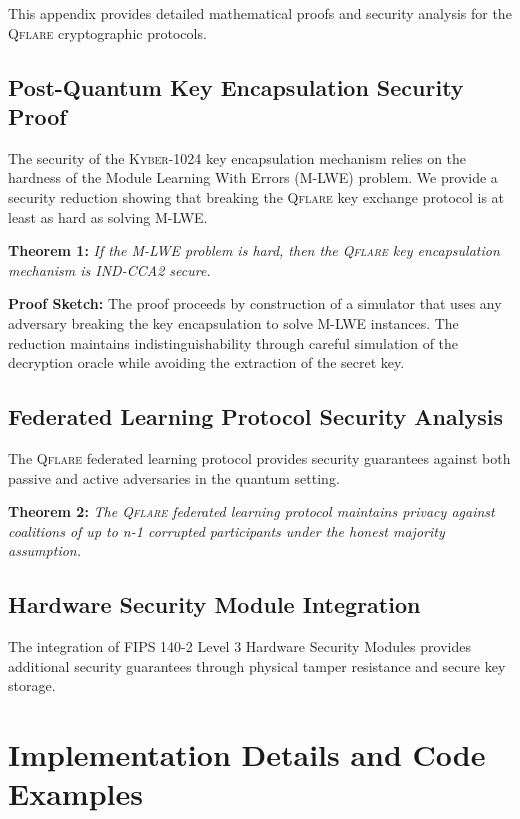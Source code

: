 \documentclass[12pt,a4paper,twoside]{book}
\newcommand{\qflare}{\textsc{Qflare}}
\newcommand{\kyber}{\textsc{Kyber}}
\begin{document}
This appendix provides detailed mathematical proofs and security analysis for the \qflare{} cryptographic protocols.

\section{Post-Quantum Key Encapsulation Security Proof}
\label{sec:kem-proof}

The security of the \kyber{}-1024 key encapsulation mechanism relies on the hardness of the Module Learning With Errors (M-LWE) problem. We provide a security reduction showing that breaking the \qflare{} key exchange protocol is at least as hard as solving M-LWE.

\textbf{Theorem 1:} \textit{If the M-LWE problem is hard, then the \qflare{} key encapsulation mechanism is IND-CCA2 secure.}

\textbf{Proof Sketch:} The proof proceeds by construction of a simulator that uses any adversary breaking the key encapsulation to solve M-LWE instances. The reduction maintains indistinguishability through careful simulation of the decryption oracle while avoiding the extraction of the secret key.

\section{Federated Learning Protocol Security Analysis}
\label{sec:fl-security-analysis}

The \qflare{} federated learning protocol provides security guarantees against both passive and active adversaries in the quantum setting.

\textbf{Theorem 2:} \textit{The \qflare{} federated learning protocol maintains privacy against coalitions of up to n-1 corrupted participants under the honest majority assumption.}

\section{Hardware Security Module Integration}
\label{sec:hsm-integration}

The integration of FIPS 140-2 Level 3 Hardware Security Modules provides additional security guarantees through physical tamper resistance and secure key storage.

\chapter{Implementation Details and Code Examples}
\label{app:implementation}
\end{document}
